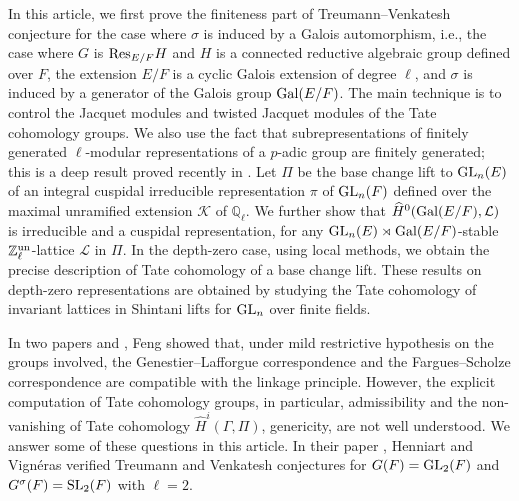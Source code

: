\documentclass[10pt, reqno]{amsart}
\theoremstyle{plain}
\numberwithin{equation}{section} \newcommand{\di}{\operatorname{dim}}
\begin{document}
In this article, we first prove the finiteness part of
Treumann--Venkatesh conjecture for the case where $\sigma$ is induced
by a Galois automorphism, i.e., the case where $G$ is
${\rm Res}_{E/F}H$ and $H$ is a connected reductive algebraic group
defined over $F$, the extension $E/F$ is a cyclic Galois extension of
degree $\ell$, and $\sigma$ is induced by a generator of the Galois
group ${\rm Gal}(E/F)$.  The main technique is to control the Jacquet
modules and twisted Jacquet modules of the Tate cohomology groups. We
also use the fact that subrepresentations of finitely generated
$\ell$-modular representations of a $p$-adic group are finitely
generated; this is a deep result proved recently in
\cite{dat_jams}. Let $\Pi$ be the base change lift to ${\rm GL}_n(E)$
of an integral cuspidal irreducible representation $\pi$ of
${\rm GL}_n(F)$ defined over the maximal unramified extension
$\mathcal{K}$ of $\mathbb{Q}_\ell$.  We further show that
$\widehat{H}^0({\rm Gal}(E/F), \mathcal{L})$ is irreducible and a
cuspidal representation, for any
${\rm GL}_n(E)\rtimes {\rm Gal}(E/F)$-stable
$\mathbb{Z}_\ell^{\rm un}$-lattice $\mathcal{L}$ in $\Pi$. In the
depth-zero case, using local methods, we obtain the precise
description of Tate cohomology of a base change lift. These results on
depth-zero representations are obtained by studying the Tate
cohomology of invariant lattices in Shintani lifts for ${\rm GL}_n$
over finite fields.

In two papers \cite{feng2023modular} and \cite{feng2024smith}, Feng
showed that, under mild restrictive hypothesis on the groups involved,
the Genestier--Lafforgue correspondence and the Fargues--Scholze
correspondence are compatible with the linkage principle. However, the
explicit computation of Tate cohomology groups, in particular,
admissibility and the non-vanishing of Tate cohomology
$\widehat{H}^i(\Gamma, \Pi)$, genericity, are not well understood. We
answer some of these questions in this article.  In their paper
\cite[Section 5.0.3]{Henniart_Vigneras_SL2}, Henniart and Vign\'eras
verified Treumann and Venkatesh conjectures for $G(F)={\rm GL}_2(F)$
and $G^\sigma(F) = {\rm SL}_2(F)$ with $\ell =2$.
\end{document}

